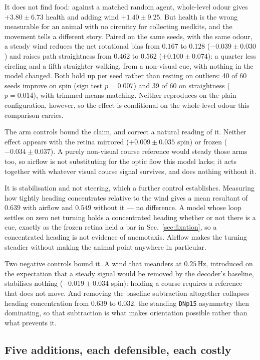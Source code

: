 \documentclass[10pt,twoside]{article}
\newcommand{\cell}[1]{\texttt{#1}}
\begin{document}
It does not find food: against a matched random agent, whole-level odour gives
$+3.80\pm6.73$ health and adding wind $+1.40\pm9.25$. But health is the wrong
measurable for an animal with no circuitry for collecting medkits, and the
movement tells a different story. Paired on the same seeds, with the same
odour, a steady wind reduces the net rotational bias from $0.167$ to $0.128$
($-0.039\pm0.030$) and raises path straightness from $0.462$ to $0.562$
($+0.100\pm0.074$): a quarter less circling and a fifth straighter walking,
from a non-visual cue, with nothing in the model changed. Both hold up per seed rather than resting on
outliers: 40 of 60 seeds improve on spin (sign test $p=0.007$) and 39 of 60 on
straightness ($p=0.014$), with trimmed means matching. Neither reproduces on
the plain configuration, however, so the effect is conditional on the
whole-level odour this comparison carries.

The arm controls bound the claim, and correct a natural reading of it. Neither
effect appears with the retina mirrored ($+0.009\pm0.035$ spin) or frozen
($-0.034\pm0.037$). A purely non-visual course reference would steady those
arms too, so airflow is not substituting for the optic flow this model lacks;
it acts together with whatever visual course signal survives, and does nothing
without it.

It is stabilisation and not steering, which a further control establishes. Measuring
how tightly heading concentrates relative to the wind gives a mean resultant of
$0.639$ with airflow and $0.549$ without it --- no difference. A model whose
loop settles on zero net turning holds a concentrated heading whether or not
there is a cue, exactly as the frozen retina held a bar in
Sec.~\ref{sec:fixation}, so a concentrated heading is not evidence of
anemotaxis. Airflow makes the turning steadier without making the animal point
anywhere in particular.

Two negative controls bound it. A wind that meanders at $0.25$\,Hz, introduced
on the expectation that a steady signal would be removed by the decoder's
baseline, stabilises nothing ($-0.019\pm0.034$ spin): holding a course requires
a reference that does not move. And removing the baseline subtraction
altogether collapses heading concentration from $0.639$ to $0.032$, the
standing \cell{DNp15} asymmetry then dominating, so that subtraction is what
makes orientation possible rather than what prevents it.

\subsection{Five additions, each defensible, each costly}
\label{sec:assembly}
\end{document}
